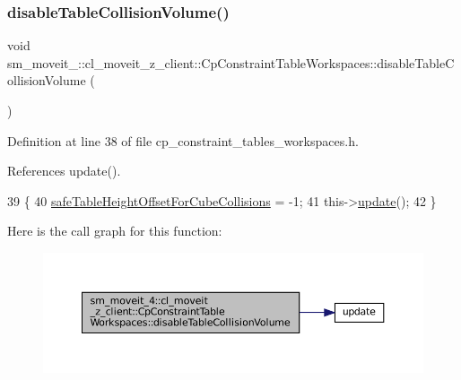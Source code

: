 \subsubsection{\texorpdfstring{disable\+Table\+Collision\+Volume()}{disableTableCollisionVolume()}}
{\footnotesize\ttfamily void sm\+\_\+moveit\+\_\+::cl\+\_\+moveit\+\_\+z\+\_\+client\+::\+Cp\+Constraint\+Table\+Workspaces\+::disable\+Table\+Collision\+Volume (\begin{DoxyParamCaption}{ }\end{DoxyParamCaption})\hspace{0.3cm}{\ttfamily [inline]}}



Definition at line 38 of file cp\+\_\+constraint\+\_\+tables\+\_\+workspaces.\+h.



References update().


\begin{DoxyCode}
39             \{
40                 \hyperlink{classsm__moveit__4_1_1cl__moveit__z__client_1_1CpConstraintTableWorkspaces_a8c9bd78c8330ae1446e5bc4d2891e285}{safeTableHeightOffsetForCubeCollisions} = -1;
41                 this->\hyperlink{classsm__moveit__4_1_1cl__moveit__z__client_1_1CpConstraintTableWorkspaces_ae0b53f2cceedd97e053e66b1df2d9486}{update}();
42             \}
\end{DoxyCode}
Here is the call graph for this function\+:
\nopagebreak
\begin{figure}[H]
\begin{center}
\leavevmode
\includegraphics[width=350pt]{classsm__moveit__4_1_1cl__moveit__z__client_1_1CpConstraintTableWorkspaces_a9c9ccbf8c1bf5c5a604a782f7c375466_cgraph}
\end{center}
\end{figure}
\mbox{\label{classsm__moveit__4_1_1cl__moveit__z__client_1_1CpConstraintTableWorkspaces_a86292aeca8f4672617b6ea617dfb4a73}} 
